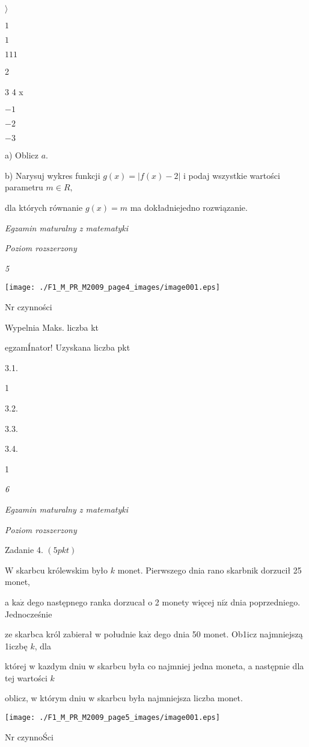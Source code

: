 \documentclass[a4paper,12pt]{article}
\begin{document}
$\rangle$

$1$

$1$

$111$

2

3 4 x

$-1$

$-2$

$-3$

a) Oblicz $a.$

b) Narysuj wykres funkcji $g(x)=|f(x)-2|$ i podaj wszystkie wartości parametru $m\in R,$

dla których równanie $g(x)=m$ ma dokładniejedno rozwiązanie.





{\it Egzamin maturalny z matematyki}

{\it Poziom rozszerzony}

{\it 5}
\begin{center}
\texttt{[image: ./F1\_M\_PR\_M2009\_page4\_images/image001.eps]}
\end{center}
Nr czynności

Wypelnia Maks. liczba kt

egzamÍnator! Uzyskana liczba pkt

3.1.

1

3.2.

3.3.

3.4.

1





{\it 6}

{\it Egzamin maturalny z matematyki}

{\it Poziom rozszerzony}

Zadanie 4. $(5pkt)$

$\mathrm{W}$ skarbcu królewskim było $k$ monet. Pierwszego dnia rano skarbnik dorzucił 25 monet,

a $\mathrm{k}\mathrm{a}\dot{\mathrm{z}}$ dego następnego ranka dorzucał o 2 monety więcej $\mathrm{n}\mathrm{i}\dot{\mathrm{z}}$ dnia poprzedniego. Jednocześnie

ze skarbca król zabierał w południe $\mathrm{k}\mathrm{a}\dot{\mathrm{z}}$ dego dnia 50 monet. Ob1icz najmniejszą 1iczbę $k$, dla

której w kazdym dniu w skarbcu była co najmniej jedna moneta, a następnie dla tej wartości $k$

oblicz, w którym dniu w skarbcu była najmniejsza liczba monet.
\begin{center}
\texttt{[image: ./F1\_M\_PR\_M2009\_page5\_images/image001.eps]}
\end{center}
Nr czynnoŚci
\end{document}
